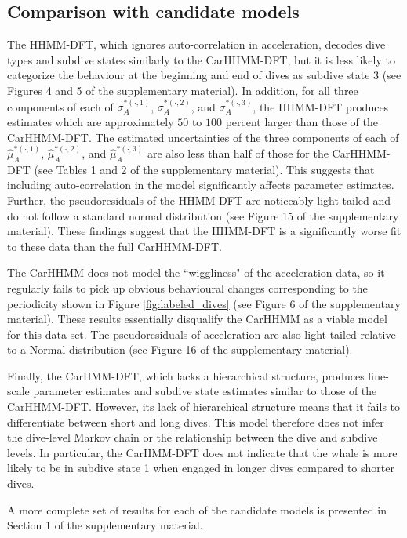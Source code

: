 \subsection{Comparison with candidate models}

The HHMM-DFT, which ignores auto-correlation in acceleration, decodes dive types and subdive states similarly to the CarHHMM-DFT, but it is less likely to categorize the behaviour at the beginning and end of dives as subdive state 3 (see Figures 4 and 5 of the supplementary material). In addition, for all three components of each of $\sigma_A^{*(\cdot,1)}$, $\sigma_A^{*(\cdot,2)}$, and $\sigma_A^{*(\cdot,3)}$, the HHMM-DFT produces estimates which are approximately $50$ to $100$ percent larger than those of the CarHHMM-DFT. The estimated uncertainties of the three components of each of $\hat \mu_A^{*(\cdot,1)}$, $\hat \mu_A^{*(\cdot,2)}$, and $\hat \mu_A^{*(\cdot,3)}$ are also less than half of those for the CarHHMM-DFT (see Tables 1 and 2 of the supplementary material). This suggests that including auto-correlation in the model significantly affects parameter estimates. Further, the pseudoresiduals of the HHMM-DFT are noticeably light-tailed and do not follow a standard normal distribution (see Figure 15 of the supplementary material). These findings suggest that the HHMM-DFT is a significantly worse fit to these data than the full CarHHMM-DFT.

The CarHHMM does not model the ``wiggliness" of the acceleration data, so it regularly fails to pick up obvious behavioural changes corresponding to the periodicity shown in Figure \ref{fig:labeled_dives} (see Figure 6 of the supplementary material). These results essentially disqualify the CarHHMM as a viable model for this data set. The pseudoresiduals of acceleration are also light-tailed relative to a Normal distribution (see Figure 16 of the supplementary material).

Finally, the CarHMM-DFT, which lacks a hierarchical structure, produces fine-scale parameter estimates and subdive state estimates similar to those of the CarHHMM-DFT. However, its lack of hierarchical structure means that it fails to differentiate between short and long dives. This model therefore does not infer the dive-level Markov chain or the relationship between the dive and subdive levels. In particular, the CarHMM-DFT does not indicate that the whale is more likely to be in subdive state 1 when engaged in longer dives compared to shorter dives. 

A more complete set of results for each of the candidate models is presented in Section 1 of the supplementary material.

